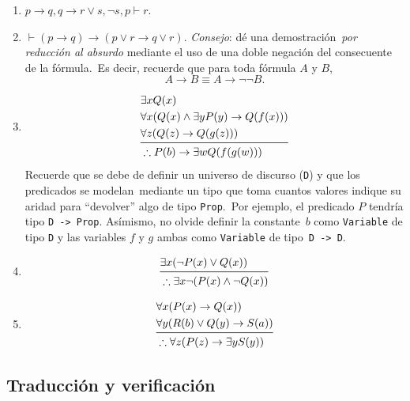 \documentclass[paper=letter, fontsize=12pt]{scrartcl}
\begin{document}
\begin{enumerate}
\item $p \to q, q \to r \vee s, \neg s, p \vdash r$.
\item $\vdash (p \to q) \to (p \vee r \to q \vee r)$. \emph{Consejo}: dé una demostración\
  \emph{por reducción al absurdo} mediante el uso de una doble negación del consecuente de la fórmula.\
  Es decir, recuerde que para toda fórmula $A$ y $B$,
  \[A \to B \equiv A \to \neg \neg B.\]
\item
  \begin{equation*}
    \begin{aligned}
      &\exists x Q(x)\\
      &\forall x (Q(x) \wedge \exists y P(y) \to Q(f(x)))\\
      &\forall z (Q(z) \to Q(g(z)))\\
      \midrule
      &\therefore P(b) \to \exists w Q(f(g(w)))
    \end{aligned}
  \end{equation*}
  Recuerde que se debe de definir un universo de discurso (\verb+D+) y que los predicados se modelan\
  mediante un tipo que toma cuantos valores indique su aridad para ``devolver'' algo de tipo \verb+Prop+.\
  Por ejemplo, el predicado $P$ tendría tipo \verb+D -> Prop+. Asímismo, no olvide definir la constante\
  $b$ como \verb+Variable+ de tipo \verb+D+ y las variables $f$ y $g$ ambas como \verb+Variable+ de tipo\
  \verb+D -> D+.
\item
  \begin{equation*}
    \begin{aligned}
      &\exists x (\neg P(x) \vee Q(x))\\
      \midrule
      &\therefore \exists x \neg (P(x) \wedge \neg Q(x))
    \end{aligned}
  \end{equation*}
\item
  \begin{equation*}
    \begin{aligned}
      &\forall x (P(x) \to Q(x))\\
      &\forall y (R(b) \vee Q(y) \to S(a))\\
      \midrule
      &\therefore \forall z (P(z) \to \exists y S(y))
    \end{aligned}
  \end{equation*}
\end{enumerate}

\subsection{Traducción y verificación}
\end{document}
